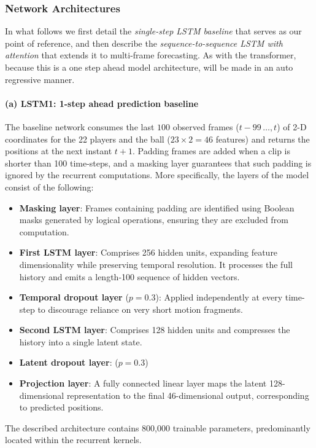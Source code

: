 \documentclass[sigconf]{acmart}
\begin{document}
\subsubsection{Network Architectures}
In what follows we first detail the \textit{single-step LSTM baseline} that serves as our point of reference, and then describe the \textit{sequence-to-sequence LSTM with attention} that extends it to multi-frame forecasting. As with the transformer, because this is a one step ahead model architecture, will be made in an auto regressive manner.

\paragraph{(a) LSTM1: 1-step ahead prediction baseline}
The baseline network consumes the last \(100\) observed frames (\(t-99\,\dots,t\)) of 2-D coordinates for the 22 players and the ball (\(23\times2=46\) features) and returns the positions at the next instant \(t+1\).  Padding frames are added when a clip is shorter than 100 time-steps, and a masking layer guarantees that such padding is ignored by the recurrent computations. More specifically, the layers of the model consist of the following:

\begin{itemize}
    \item \textbf{Masking layer}: Frames containing padding are identified using Boolean masks generated by logical operations, ensuring
they are excluded from computation.
    \item \textbf{First LSTM layer}: Comprises 256 hidden units, expanding feature dimensionality while preserving temporal resolution. It processes the full history and emits a length-100 sequence of hidden vectors.
    \item \textbf{Temporal dropout layer} (\(p=0.3\)): Applied independently at every time-step to discourage reliance on very short motion fragments.
    \item \textbf{Second LSTM layer}: Comprises 128 hidden units and compresses the history into a single latent state.
    \item \textbf{Latent dropout layer}: (\(p=0.3\))
    \item \textbf{Projection layer}: A fully connected linear layer maps the latent 128-dimensional representation to the final 46-dimensional output, corresponding to predicted positions.
\end{itemize}

The described architecture contains 800,000 trainable parameters, predominantly located within the recurrent kernels.
\end{document}
